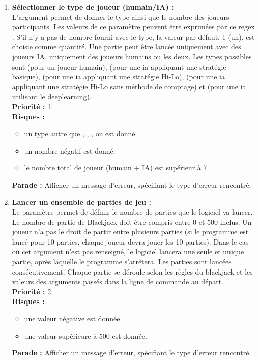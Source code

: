 \begin{enumerate}
    \item \textbf{Sélectionner le type de joueur (humain/IA) :} \\
    L'argument  permet de donner le type ainsi que le nombre des joueurs participants. Les valeurs de ce paramètre peuvent être exprimées par ce regex . S'il n'y a pas de nombre fourni avec le type, la valeur par défaut, 1 (un), est choisie comme quantité. Une partie peut être lancée uniquement avec des joueurs IA, uniquement des joueurs humains ou les deux.
    Les types possibles sont  (pour un joueur humain),  (pour une ia appliquant une stratégie basique),  (pour une ia appliquant une stratégie Hi-Lo),  (pour une ia appliquant une stratégie Hi-Lo sans méthode de comptage) et  (pour une ia utilisant le deeplearning). \\
    \textbf{Priorité :} 1. \\
    \textbf{Risques :}
    \begin{itemize}
        \item un type autre que , , ,  ou  est donné.
        \item un nombre négatif est donné.
        \item le nombre total de joueur (humain + IA) est supérieur à 7.
    \end{itemize}
    \textbf{Parade :} Afficher un message d'erreur, spécifiant le type d'erreur rencontré.

    \item \textbf{Lancer un ensemble de parties de jeu :} \\
    Le paramètre  permet de définir le nombre de parties que le logiciel va lancer. Le nombre de partie de Blackjack doit être compris entre 0 et 500 inclus.
    Un joueur n'a pas le droit de partir entre plusieurs parties (si le programme est lancé pour 10 parties, chaque joueur devra jouer les 10 parties). Dans le cas où cet argument n'est pas renseigné, le logiciel lancera une seule et unique partie, après laquelle le programme s'arrêtera. Les parties sont lancées consécutivement. Chaque partie se déroule selon les règles du blackjack et les valeurs des arguments passés dans la ligne de commande au départ. \\
    \textbf{Priorité :} 2. \\
    \textbf{Risques :}
    \begin{itemize}
        \item une valeur négative est donnée.
        \item une valeur supérieure à 500 est donnée.
    \end{itemize}
    \textbf{Parade :} Afficher un message d'erreur, spécifiant le type d'erreur rencontré.
    

\end{enumerate}
